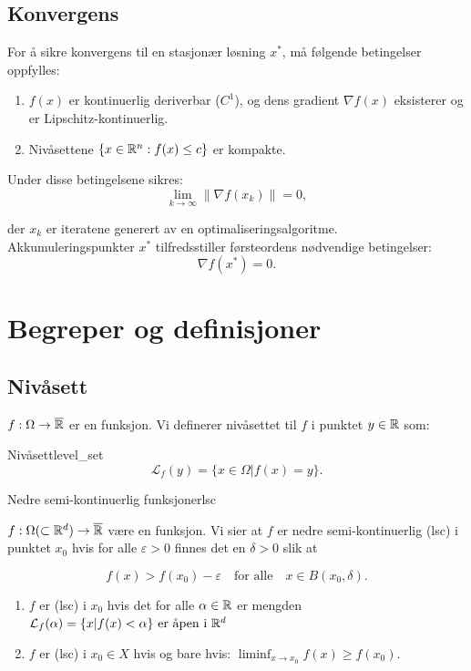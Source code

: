 \documentclass[10pt, a4paper]{article}
\begin{document}
\subsection*{Konvergens}
For å sikre konvergens til en stasjonær løsning \( x^* \), må følgende betingelser oppfylles:
\begin{enumerate}
  \item \( f(x) \) er kontinuerlig deriverbar (\( C^1 \)), og dens gradient \( \nabla f(x) \) eksisterer og er Lipschitz-kontinuerlig.
  \item Nivåsettene \( \{x \in \mathbb{R}^n : f(x) \leq c\} \) er kompakte.
\end{enumerate}

Under disse betingelsene sikres:
\[
  \lim_{k \to \infty} \|\nabla f(x_k)\| = 0,
\]

der \( x_k \) er iteratene generert av en optimaliseringsalgoritme. Akkumuleringspunkter \( x^* \) tilfredsstiller førsteordens nødvendige betingelser:
\[
  \nabla f(x^*) = 0.
\]

\section{Begreper og definisjoner}

\subsection{Nivåsett}

\(f: \Omega \to \overline{\mathbb{R}}\) er en funksjon. Vi definerer nivåsettet til \(f\) i punktet \(y \in \mathbb{R}\) som:

\begin{definition}{Nivåsett}{level_set}
  \[
    \mathcal{L}_f(y) = \{x \in \Omega | f(x) = y\}.
  \]
\end{definition}

\begin{definition}{Nedre semi-kontinuerlig funksjoner}{lsc}

  \(f: \Omega (\subset \mathbb{R}^d) \to \overline{\mathbb{R}}\) være en funksjon. Vi sier at \(f\) er nedre semi-kontinuerlig (lsc) i punktet \(x_0\) hvis for alle \(\varepsilon > 0\) finnes det en \(\delta > 0\) slik at

  \[
    f(x) > f(x_0) - \varepsilon \quad \text{for alle} \quad x \in B(x_0, \delta).
  \]

  \begin{enumerate}
    \item \(f\) er (lsc) i \(x_0\) hvis det for alle \(\alpha \in \mathbb{R}\) er mengden \(\mathcal{L}_f(\alpha) = \{x | f(x) < \alpha \} \text{ er åpen i } \mathbb{R}^d\)
    \item \(f\) er (lsc) i \(x_0 \in X\) hvis og bare hvis: \(\liminf_{x \to x_0} f(x) \geq f(x_0)\).
  \end{enumerate}

\end{definition}
\end{document}
